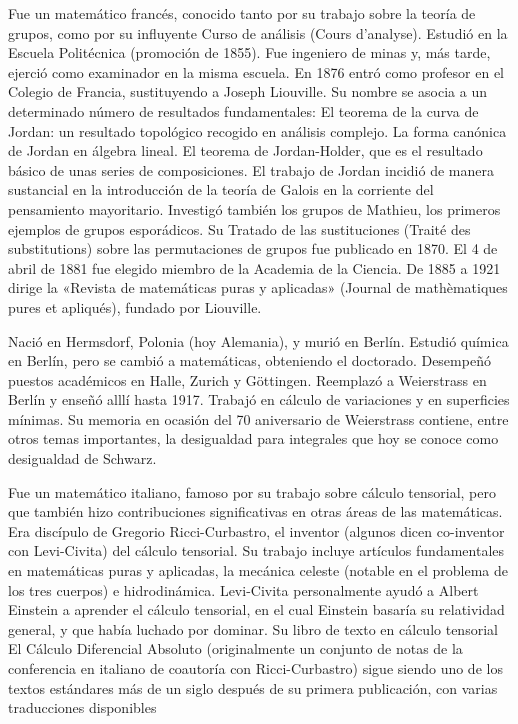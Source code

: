 \begin{parchment} {Fue un matemático francés, conocido tanto por su trabajo sobre la teoría de grupos, como por su influyente Curso de análisis (Cours d’analyse). Estudió en la Escuela Politécnica (promoción de 1855). Fue ingeniero de minas y, más tarde, ejerció como examinador en la misma escuela. En 1876 entró como profesor en el Colegio de Francia, sustituyendo a Joseph Liouville.
Su nombre se asocia a un determinado número de resultados fundamentales:
El teorema de la curva de Jordan: un resultado topológico recogido en análisis complejo.
La forma canónica de Jordan en álgebra lineal.
El teorema de Jordan-Holder, que es el resultado básico de unas series de composiciones.
El trabajo de Jordan incidió de manera sustancial en la introducción de la teoría de Galois en la corriente del pensamiento mayoritario. Investigó también los grupos de Mathieu, los primeros ejemplos de grupos esporádicos. Su Tratado de las sustituciones (Traité des substitutions) sobre las permutaciones de grupos fue publicado en 1870.
El 4 de abril de 1881 fue elegido miembro de la Academia de la Ciencia.
De 1885 a 1921 dirige la «Revista de matemáticas puras y aplicadas» (Journal de mathèmatiques pures et apliqués), fundado por Liouville.}
\end{parchment}


\begin{parchment} { Nació en Hermsdorf, Polonia (hoy Alemania), y murió en Berlín. Estudió química en Berlín, pero se cambió a matemáticas, obteniendo el doctorado. Desempeñó puestos académicos en Halle, Zurich y Göttingen. Reemplazó a Weierstrass en Berlín y enseñó alllí hasta 1917. Trabajó en cálculo de variaciones y en superficies mínimas. Su memoria en ocasión del 70 aniversario de Weierstrass contiene, entre otros temas importantes, la desigualdad para integrales que hoy se conoce como desigualdad de Schwarz.}
\end{parchment}

\begin{parchment}{ Fue un matemático italiano, famoso por su trabajo sobre cálculo tensorial, pero que también hizo contribuciones significativas en otras áreas de las matemáticas. Era discípulo de Gregorio Ricci-Curbastro, el inventor (algunos dicen co-inventor con Levi-Civita) del cálculo tensorial. Su trabajo incluye artículos fundamentales en matemáticas puras y aplicadas, la mecánica celeste (notable en el problema de los tres cuerpos) e hidrodinámica.
Levi-Civita personalmente ayudó a Albert Einstein a aprender el cálculo tensorial, en el cual Einstein basaría su relatividad general, y que había luchado por dominar. Su libro de texto en cálculo tensorial El Cálculo Diferencial Absoluto (originalmente un conjunto de notas de la conferencia en italiano de coautoría con Ricci-Curbastro) sigue siendo uno de los textos estándares más de un siglo después de su primera publicación, con varias traducciones disponibles}
\end{parchment}





